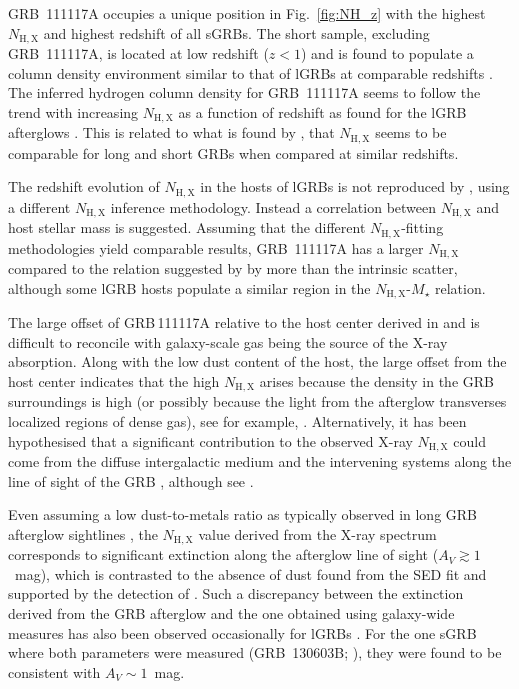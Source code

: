 \documentclass[referee]{aa}
\begin{document}
GRB~111117A occupies a unique position in Fig.~\ref{fig:NH_z} with the highest
$N_\mathrm{H,X}$ and highest redshift of all sGRBs. The short sample, excluding
GRB~111117A, is located at low redshift ($z < 1$) and is found to populate a
column density environment similar to that of lGRBs at comparable redshifts
\citep{DAvanzo2014a}. The inferred hydrogen column density for GRB~111117A seems
to follow the trend with increasing $N_\mathrm{H,X}$ as a function of redshift as found for
the lGRB afterglows \citep{Campana2010, Starling2013, Arcodia2016}. This is
related to what is found by \citet{Kopac2012, Margutti2013}, that $N_\mathrm{H,X}$ seems to
be comparable for long and short GRBs when compared at similar redshifts.

The redshift evolution of $N_\mathrm{H,X}$ in the hosts of lGRBs is not
reproduced by \citet{Buchner2017}, using a different $N_\mathrm{H,X}$ inference
methodology. Instead a correlation between $N_\mathrm{H,X}$ and host stellar
mass is suggested. Assuming that the different $N_\mathrm{H,X}$-fitting
methodologies yield comparable results, GRB~111117A has a larger
$N_\mathrm{H,X}$ compared to the relation suggested by \citet{Buchner2017} by
more than the intrinsic scatter, although some lGRB hosts populate a similar
region in the $N_\mathrm{H,X}$-$M_\star$ relation.

The large offset of GRB\,111117A relative to the host center derived in
\citet{Margutti2012} and \citet{Sakamoto2013} is difficult to reconcile with
galaxy-scale gas being the source of the X-ray absorption. Along with the low
dust content of the host, the large offset from the host center indicates that
the high $N_\mathrm{H,X}$ arises because the density in the GRB surroundings is
high (or possibly because the light from the afterglow transverses localized
regions of dense gas), see for example,
\citep[e.g.][]{Watson2013, Krongold2013}. Alternatively, it has been
hypothesised that a significant contribution to the observed X-ray
$N_\mathrm{H,X}$ could come from the diffuse intergalactic medium and the
intervening systems along the line of sight of the GRB \citep{Campana2012,
	Arcodia2016}, although see \citep{Watson2013, Krongold2013}.

Even assuming a low dust-to-metals ratio as typically observed in long GRB
afterglow sightlines \citep{Galama2001, Schady2010, Covino2013}, the
$N_\mathrm{H,X}$ value derived from the X-ray spectrum corresponds to
significant extinction along the afterglow line of sight ($A_V \gtrsim 1$~mag),
which is contrasted to the absence of dust found from the SED fit and supported
by the detection of \lya{}. Such a discrepancy between the extinction derived
from the GRB afterglow and the one obtained using galaxy-wide measures has also
been observed occasionally for lGRBs \citep{Perley2013a}. For the one sGRB where
both parameters were measured (GRB~130603B; \citealt{DeUgartePostigo2014b}),
they were found to be consistent with $A_V \sim 1$~mag.
\end{document}
